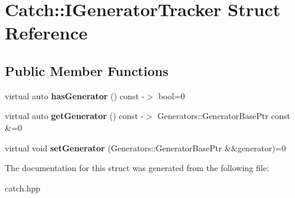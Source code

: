 \hypertarget{structCatch_1_1IGeneratorTracker}{}\section{Catch\+:\+:I\+Generator\+Tracker Struct Reference}
\label{structCatch_1_1IGeneratorTracker}
\subsection*{Public Member Functions}
\begin{DoxyCompactItemize}
\item 
\mbox{\label{structCatch_1_1IGeneratorTracker_ae88084f9af27c8b9a5d5775b9c148498}} 
virtual auto {\bfseries has\+Generator} () const -\/$>$ bool=0
\item 
\mbox{\label{structCatch_1_1IGeneratorTracker_a23be942fc51672598bfa02c678c3078a}} 
virtual auto {\bfseries get\+Generator} () const -\/$>$ Generators\+::\+Generator\+Base\+Ptr const \&=0
\item 
\mbox{\label{structCatch_1_1IGeneratorTracker_a9945eff42219edc5a7071eebd8b0419e}} 
virtual void {\bfseries set\+Generator} (Generators\+::\+Generator\+Base\+Ptr \&\&generator)=0
\end{DoxyCompactItemize}


The documentation for this struct was generated from the following file\+:\begin{DoxyCompactItemize}
\item 
catch.\+hpp\end{DoxyCompactItemize}
